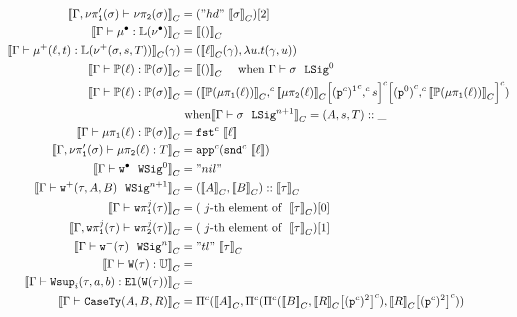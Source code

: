 \begin{align*}
  \denotesC{\goodType{\Gm, \lsigprojT{\lsig}}{\lsigproj{2}{\lsig}}{}} &= ("hd"~\denotesC{\lsig})[2]\\
  \denotesC{\goodTerm{\Gm}{\LkgEmp}{\TyLkg{\LSigEmp}}} &= \denotesC{\unit} \\
  \denotesC{\goodTerm{\Gm}{\LkgAdd{\lkg}{t}}{\TyLkg{\LSigAdd{\lsig}{s}{T}}}}(\gm) &= (\denotesC{\lkg}(\gm), \lambda u . t (\gm, u)) \\
  \denotesC{\goodTerm{\Gm}{\Tkg{\lkg}}{\TyTkg{\lsig}}} &= \denotesC{\unit}
  \quad \text{ when \goodSig{\Gm}{\lsig}{0}} \\
  \denotesC{\goodTerm{\Gm}{\Tkg{\lkg}}{\TyTkg{\lsig}}} &= \Gpair{\denotesC{\Tkg{\lkgproj{1}{\lkg}}}}{\Gsub{\Gsub{\denotesC{\lkgproj{2}{\lkg}}}{\GSubstExt{\Glued{\GSubstWeak{1}}}{s}}}{\GSubstExt{\Glued{(\SubstId)}}{\denotesC{\Tkg{\lkgproj{1}{\lkg}}}}}}
  \\ &\text{ when} \denotesC{\goodSig{\Gm}{\lsig}{n+1}} = (A, s, T)::\_ \\
  \denotesC{\goodTerm{\Gm}{\lkgproj{1}{\lkg}}{\TyTkg{\lsig}}} &= \Gfst{\denotes{\lkg}} \\
  \denotesC{\goodTerm{\Gm, \lsigprojT{\lsig}}{\lkgproj{2}{\lkg}}{T}} &= \Gapp{\Gsnd{\denotes{\lkg}}} \\
  \denotesC{\goodWSig{\Gm}{\WSigEmp}{0}} &= "nil" \\
  \denotesC{\goodWSig{\Gm}{\WSigAdd{\wsig}{A}{B}}{n+1}} &= (\denotesC{A} , \denotesC{B}) :: \denotesC{\wsig}\\
  \denotesC{\goodType{\Gm}{\wsigproj{j}{1}{\wsig}}{}} &= (\text{ $j$-th element of }~\denotesC{\wsig})[0]\\
  \denotesC{\goodType{\Gm, \wsigproj{j}{1}{\wsig}}{\wsigproj{j}{2}{\wsig}}{}} &= (\text{ $j$-th element of }~\denotesC{\wsig})[1]\\
  \denotesC{\goodWSig{\Gm}{\WSigSub{\wsig}}{n}} &= "tl"~\denotesC{\wsig}\\
  \denotesC{\goodTerm{\Gm}{\wcode{\wsig}}{\cU}} &= \\
  \denotesC{\goodTerm{\Gm}{\Wsup{i}{\wsig}{a}{b}}{\El{\wcode{\wsig}}}} &= \\
  \denotesC{\goodType{\Gm}{\CaseSig{A}{B}{R}}{}} &= 
  {\GluedPi{\denotesC{A}}{\GluedPi {\GluedPi{\denotesC{B}}{\Gsub{\denotesC{R}}{\GSubstWeak{2}}}} {\Gsub{\denotesC{R}}{\GSubstWeak{2}}}}} \\

\end{align*}
